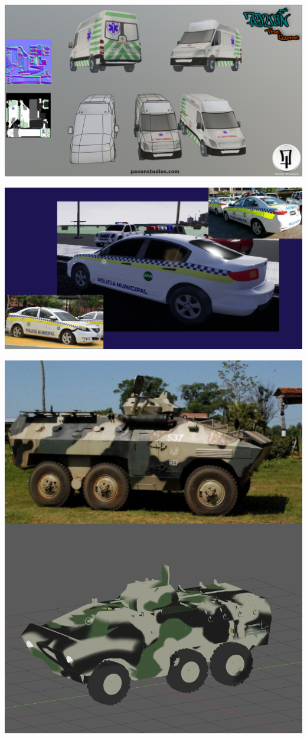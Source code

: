 \documentclass{article}
\begin{document}
  \includegraphics[width=\textwidth]{71.png}
  
  \includegraphics[width=\textwidth]{69.png}
  
  \includegraphics[width=\textwidth]{70.png}
  
\end{document}
